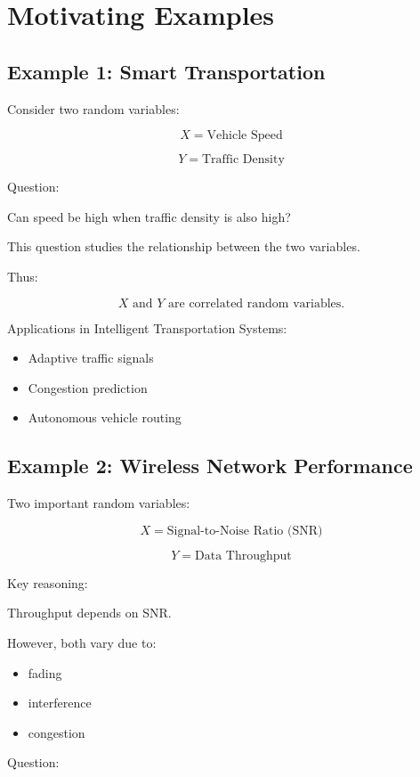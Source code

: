 \documentclass[12pt]{article}
\begin{document}
\section{Motivating Examples}

\subsection{Example 1: Smart Transportation}

Consider two random variables:

\[
X = \text{Vehicle Speed}
\]

\[
Y = \text{Traffic Density}
\]

Question:

Can speed be high when traffic density is also high?

This question studies the relationship between the two variables.

Thus:

\[
X \text{ and } Y \text{ are correlated random variables.}
\]

Applications in Intelligent Transportation Systems:

\begin{itemize}
\item Adaptive traffic signals
\item Congestion prediction
\item Autonomous vehicle routing
\end{itemize}

\subsection{Example 2: Wireless Network Performance}

Two important random variables:

\[
X = \text{Signal-to-Noise Ratio (SNR)}
\]

\[
Y = \text{Data Throughput}
\]

Key reasoning:

Throughput depends on SNR.

However, both vary due to:

\begin{itemize}
\item fading
\item interference
\item congestion
\end{itemize}

Question:
\end{document}
